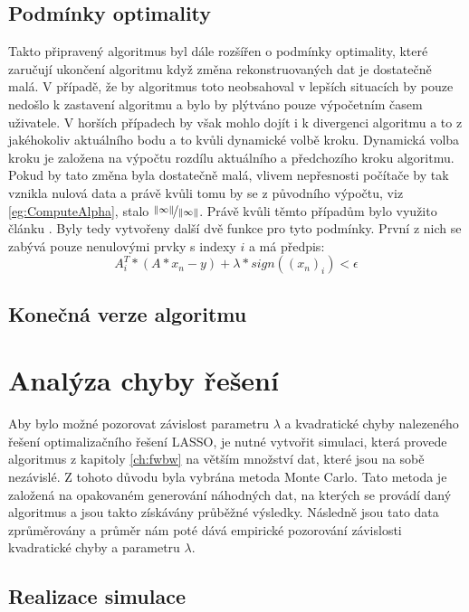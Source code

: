 \documentclass[FM,BP]{tulthesis}
\newcounter{Vzorce}
\begin{document}
\section{Podmínky optimality}
Takto připravený algoritmus byl dále rozšířen o podmínky optimality, které zaručují ukončení algoritmu když změna rekonstruovaných dat je dostatečně malá. V případě, že by algoritmus toto neobsahoval v lepších situacích by pouze nedošlo k zastavení algoritmu a bylo by plýtváno pouze výpočetním časem uživatele. V horších případech by však mohlo dojít i k divergenci algoritmu a to z jakéhokoliv aktuálního bodu a to kvůli dynamické volbě kroku. Dynamická volba kroku je založena na výpočtu rozdílu aktuálního a předchozího kroku algoritmu. Pokud by tato změna byla dostatečně malá, vlivem nepřesnosti počítače by tak vznikla nulová data a právě kvůli tomu by se z původního výpočtu, viz \ref{eg:ComputeAlpha}, stalo $\nicefrac{\left\| \infty\right\| }{\left\| \infty\right\| }$. Právě kvůli těmto případům bylo využito článku \cite{homotopy}. Byly tedy vytvořeny další dvě funkce pro tyto podmínky. První z nich se zabývá pouze nenulovými prvky s indexy $i$ a má předpis:
\begin{equation} \label{eg:homotopy1}  \tag{Vzorec \theVzorce}
A_{i}^{T}*(A*x_{n} - y) + \lambda * sign((x_{n})_{i}) < \epsilon
\end{equation}

\section{Konečná verze algoritmu}

\chapter{Analýza chyby řešení}
\label{ch:simulace}
Aby bylo možné pozorovat závislost parametru $\lambda$ a kvadratické chyby nalezeného řešení optimalizačního řešení LASSO, je nutné vytvořit simulaci, která provede algoritmus z kapitoly \ref{ch:fwbw} na větším množství dat, které jsou na sobě nezávislé. Z tohoto důvodu byla vybrána metoda Monte Carlo. Tato metoda je založená na opakovaném generování náhodných dat, na kterých se provádí daný algoritmus a jsou takto získávány průběžné výsledky. Následně jsou tato data zprůměrovány a průměr nám poté dává empirické pozorování závislosti kvadratické chyby a parametru $\lambda$.
\section{Realizace simulace}
\end{document}

